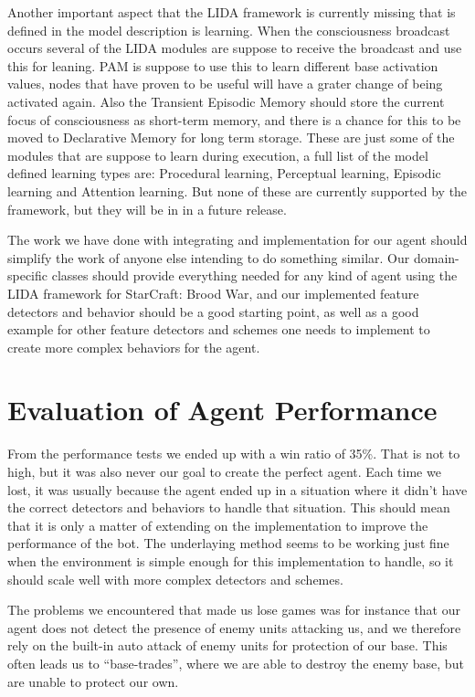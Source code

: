 Another important aspect that the LIDA framework is currently missing that is defined in the model description is learning. When the consciousness broadcast occurs several of the LIDA modules are suppose to receive the broadcast and use this for leaning. PAM is suppose to use this to learn different base activation values, nodes that have proven to be useful will have a grater change of being activated again. Also the Transient Episodic Memory should store the current focus of consciousness as short-term memory, and there is a chance for this to be moved to Declarative Memory for long term storage. These are just some of the modules that are suppose to learn during execution, a full list of the model defined learning types are: Procedural learning, Perceptual learning, Episodic learning and Attention learning. But none of these are currently supported by the framework, but they will be in in a future release.

The work we have done with integrating and  implementation for our agent should simplify the work of anyone else intending to do something similar. Our domain-specific classes should provide everything needed for any kind of agent using the LIDA framework for StarCraft: Brood War, and our implemented feature detectors and behavior should be a good starting point, as well as a good example for other feature detectors and schemes one needs to implement to create more complex behaviors for the agent.

\section{Evaluation of Agent Performance}
\label{sec:evalperf}
From the performance tests we ended up with a win ratio of 35\%. That is not to high, but it was also never our goal to create the perfect agent. Each time we lost, it was usually because the agent ended up in a situation where it didn't have the correct detectors and behaviors to handle that situation. This should mean that it is only a matter of extending on the implementation to improve the performance of the bot. The underlaying method seems to be working just fine when the environment is simple enough for this implementation to handle, so it should scale well with more complex detectors and schemes.

The problems we encountered that made us lose games was for instance that our agent does not detect the presence of enemy units attacking us, and we therefore rely on the built-in auto attack of enemy units for protection of our base. This often leads us to ``base-trades'', where we are able to destroy the enemy base, but are unable to protect our own.


